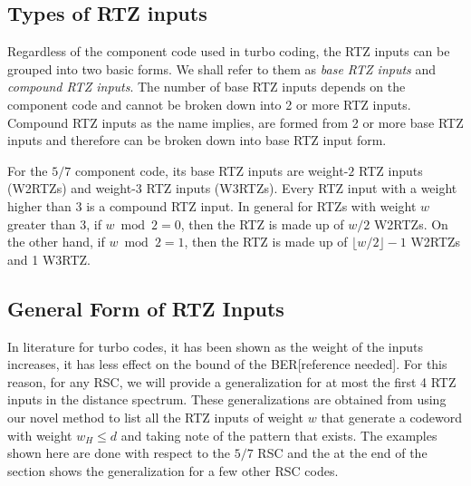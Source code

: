 \subsection{Types of RTZ inputs}
Regardless of the component code used in turbo coding, the RTZ inputs can be grouped into two basic forms. We shall refer to them as \textit{base RTZ inputs} and \textit{compound RTZ inputs}. The number of base RTZ inputs depends on the component code and cannot be broken down into 2 or more RTZ inputs. Compound RTZ inputs as the name implies, are formed from 2 or more base RTZ inputs and therefore can be broken down into base RTZ input form.

For the $5/7$ component code, its base RTZ inputs are weight-$2$ RTZ inputs  (W2RTZs) and weight-$3$ RTZ inputs (W3RTZs). Every RTZ input with a weight higher than 3 is a compound RTZ input. In general for RTZs with weight $w$ greater than 3, if $w \bmod 2=0$, then the RTZ is made up of $w/2$ W2RTZs. On the other hand, if $w \bmod 2=1$, then the RTZ is made up of $\lfloor w/2 \rfloor -1$ W2RTZs and 1 W3RTZ.


\subsection{General Form of RTZ Inputs}
In literature for turbo codes, it has been shown as the weight of the inputs increases, it has less effect on the bound of the BER[reference needed]. For this reason, for any RSC, we will provide a generalization for at most the first 4 RTZ inputs in the distance spectrum. These generalizations are obtained from using our novel method to list all the RTZ inputs of weight $w$ that generate a codeword with weight $w_H \leq d$ and taking note of the pattern that exists. The examples shown here are done with respect to the $5/7$ RSC and the at the end of the section shows the generalization for a few other RSC codes.

